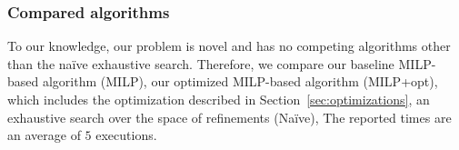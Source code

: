 \subsubsection*{Compared algorithms}
To our knowledge, our problem is novel and has no competing algorithms other than the na\"{i}ve exhaustive search. Therefore, we compare our baseline MILP-based algorithm (MILP), our optimized MILP-based algorithm (MILP+opt), which includes the optimization described in Section~\ref{sec:optimizations}, an exhaustive search over the space of refinements (Na\"{i}ve),  
 
The reported times are an average of $5$ executions.

 

